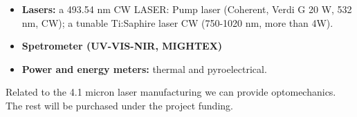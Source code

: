 \begin{itemize}
\item \textbf{Lasers:} a 493.54 nm CW LASER: Pump laser (Coherent, Verdi G 20 W, 532 nm, CW); a tunable Ti:Saphire laser CW (750-1020 nm,  more than 4W).

\item \textbf{Spetrometer (UV-VIS-NIR, MIGHTEX)}

\item \textbf{Power and energy meters:} thermal and pyroelectrical. 

\end{itemize}

Related to the 4.1 micron laser manufacturing we can provide optomechanics. The rest will be purchased under the project funding. 

  